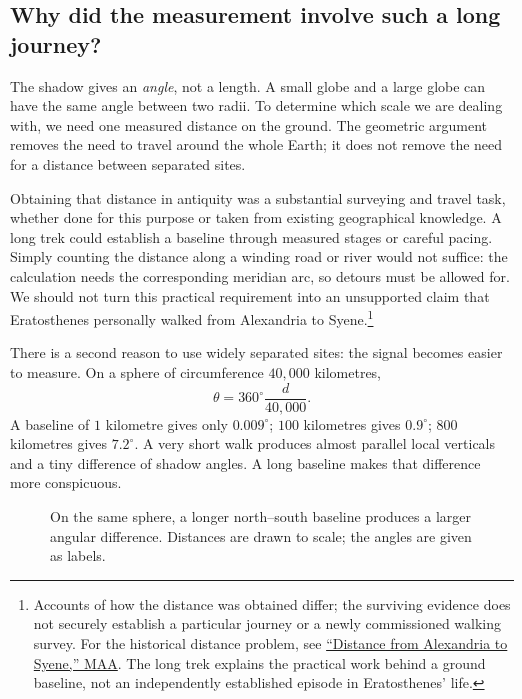 \subsection{Why did the measurement involve such a long journey?}
The shadow gives an \emph{angle}, not a length. A small globe and a large
globe can have the same angle between two radii. To determine which scale
we are dealing with, we need one measured distance on the ground. The
geometric argument removes the need to travel around the whole Earth;
it does not remove the need for a distance between separated sites.

Obtaining that distance in antiquity was a substantial surveying and travel
task, whether done for this purpose or taken from existing geographical
knowledge. A long trek could establish a baseline through measured stages
or careful pacing. Simply counting the distance along a winding road or
river would not suffice: the calculation needs the corresponding meridian
arc, so detours must be allowed for. We should not turn this practical
requirement into an unsupported claim that Eratosthenes personally walked
from Alexandria to Syene.\footnote{Accounts of how the distance was
obtained differ; the surviving evidence does not securely establish a
particular journey or a newly commissioned walking survey. For the
historical distance problem, see
\href{https://old.maa.org/press/periodicals/convergence/eratosthenes-and-the-mystery-of-the-stades-distance-from-alexandria-to-syene}{``Distance from Alexandria to Syene,'' MAA}.
The long trek explains the practical work behind a ground baseline, not
an independently established episode in Eratosthenes' life.}

There is a second reason to use widely separated sites: the signal becomes
easier to measure. On a sphere of circumference $40{,}000$ kilometres,
\[
\theta=360^\circ\frac{d}{40{,}000}.
\]
A baseline of $1$ kilometre gives only $0.009^\circ$; $100$ kilometres
gives $0.9^\circ$; $800$ kilometres gives $7.2^\circ$. A very short walk
produces almost parallel local verticals and a tiny difference of shadow
angles. A long baseline makes that difference more conspicuous.

\begin{figure}[htbp]\centering
{}
\caption{On the same sphere, a longer north--south baseline produces a larger angular difference. Distances are drawn to scale; the angles are given as labels.}
\end{figure}

